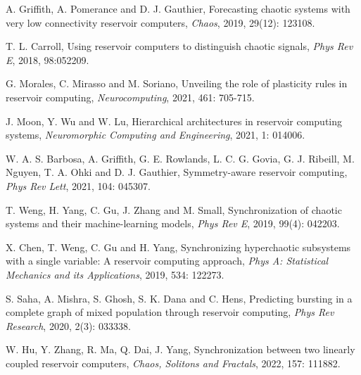 \documentclass[notitlepage,cs4size,punct,oneside]{ctexrep}
\numberwithin{equation}{chapter}
\theoremstyle{mystyle}
\begin{document}
\begin{thebibliography}{99}
 A. Griffith, A. Pomerance and D. J. Gauthier,
Forecasting chaotic systems with very low connectivity reservoir computers,
\emph{Chaos}, 2019, 29(12): 123108.

 T. L. Carroll,
Using reservoir computers to distinguish chaotic signals, 
\emph{Phys Rev E}, 2018, 98:052209.

 G. Morales, C. Mirasso and M. Soriano,
Unveiling the role of plasticity rules in reservoir computing,
\emph{Neurocomputing}, 2021, 461: 705-715.

 J. Moon, Y. Wu and W. Lu,
Hierarchical architectures in reservoir computing systems,
\emph{Neuromorphic Computing and Engineering}, 2021, 1: 014006.









 W. A. S. Barbosa, A. Griffith, G. E. Rowlands, L. C. G. Govia, G. J. Ribeill, M. Nguyen, T. A. Ohki and D. J. Gauthier,
Symmetry-aware reservoir computing,
\emph{Phys Rev Lett}, 2021, 104: 045307.

 T. Weng, H. Yang, C. Gu, J. Zhang and M. Small,
Synchronization of chaotic systems and their machine-learning models,
\emph{Phys Rev E}, 2019, 99(4): 042203.

 X. Chen, T. Weng, C. Gu and H. Yang,
Synchronizing hyperchaotic subsystems with a single variable: A reservoir computing approach,
\emph{Phys A: Statistical Mechanics and its Applications}, 2019, 534: 122273.

 S. Saha, A. Mishra, S. Ghosh, S. K. Dana and C. Hens,
Predicting bursting in a complete graph of mixed population through reservoir computing, 
\emph{Phys Rev Research}, 2020, 2(3): 033338.

 W. Hu, Y. Zhang, R. Ma, Q. Dai, J. Yang,
Synchronization between two linearly coupled reservoir computers, 
\emph{Chaos, Solitons and Fractals}, 2022, 157: 111882.




























\end{thebibliography}
\end{document}
